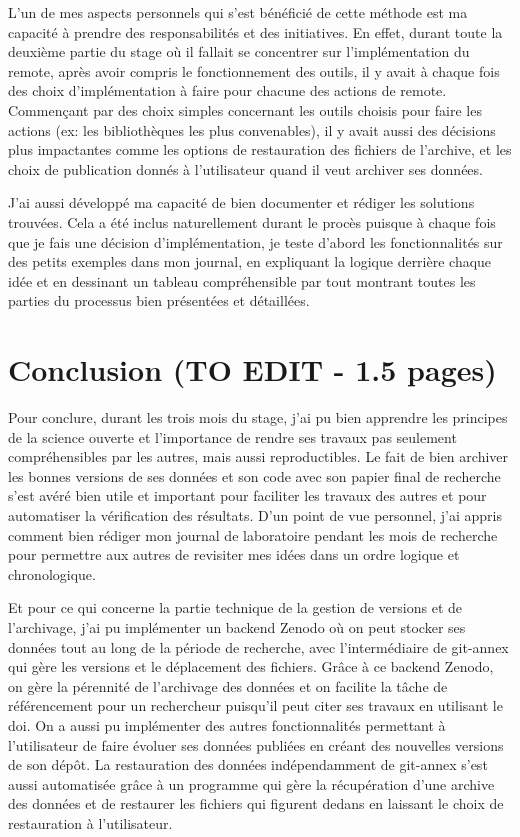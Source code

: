 \documentclass[11pt]{article}
\begin{document}
L'un de mes aspects personnels qui s'est bénéficié de cette
méthode est ma capacité à prendre des responsabilités et des
initiatives. En effet, durant toute la deuxième partie du stage où il
fallait se concentrer sur l'implémentation du remote, après avoir
compris le fonctionnement des outils, il y avait à chaque fois des
choix d'implémentation à faire pour chacune des actions de
remote. Commençant par des choix simples concernant les outils choisis
pour faire les actions (ex: les bibliothèques les plus convenables),
il y avait aussi des décisions plus impactantes comme les options de
restauration des fichiers de l'archive, et les choix de publication
donnés à l'utilisateur quand il veut archiver ses données.

J'ai aussi développé ma capacité de bien documenter et rédiger les
solutions trouvées. Cela a été inclus naturellement durant le procès
puisque à chaque fois que je fais une décision d'implémentation, je
teste d'abord les fonctionnalités sur des petits exemples dans mon
journal, en expliquant la logique derrière chaque idée et en dessinant
un tableau compréhensible par tout montrant toutes les parties du
processus bien présentées et détaillées. 

\section{Conclusion (TO EDIT - 1.5 pages)}
\label{sec:org9722282}
Pour conclure, durant les trois mois du stage, j'ai pu bien apprendre
les principes de la science ouverte et l'importance de
rendre ses travaux pas seulement compréhensibles par les autres, mais
aussi reproductibles. Le fait de bien archiver les bonnes versions de
ses données et son code avec son papier final de recherche s'est avéré
bien utile et important pour faciliter les travaux des autres et pour
automatiser la vérification des résultats. D'un point de vue personnel,
j'ai appris comment bien rédiger mon journal de laboratoire pendant
les mois de recherche pour permettre aux autres de revisiter mes idées
dans un ordre logique et chronologique.

Et pour ce qui concerne la partie technique de la gestion de versions
et de l'archivage, j'ai pu implémenter un backend Zenodo où on peut
stocker ses données tout au long de la période de recherche, avec
l'intermédiaire de git-annex qui gère les versions et le déplacement
des fichiers. Grâce à ce backend Zenodo, on gère la pérennité de
l'archivage des données et on facilite la tâche de référencement pour
un rechercheur puisqu'il peut citer ses travaux en utilisant le
doi. On a aussi pu implémenter des autres fonctionnalités permettant à
l'utilisateur de faire évoluer ses données publiées en créant des
nouvelles versions de son dépôt. La restauration des données
indépendamment de git-annex s'est aussi automatisée grâce à un
programme qui gère la récupération d'une archive des données et de
restaurer les fichiers qui figurent dedans en laissant le choix de
restauration à l'utilisateur.
\end{document}
